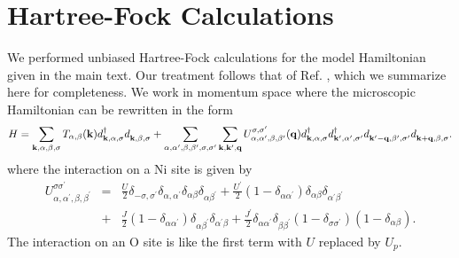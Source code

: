 \documentclass[showpacs,preprintnumbers,amsmath,amssymb,prl,aps,onecolumn,superscriptaddress]{revtex4}
\newcommand{\bk}{{\bf k}}
\newcommand{\bq}{{\bf q}}
\begin{document}
\section{Hartree-Fock Calculations}
We performed unbiased Hartree-Fock calculations for the model
Hamiltonian given in the main text.   
Our treatment follows that of Ref. , which we 
summarize here for completeness. We work in momentum space where the 
microscopic Hamiltonian can be rewritten in the form 
\begin{equation}
H=\sum_{\bk,\alpha,\beta,\sigma} T_{\alpha,\beta}(\bk) d^\dagger_{\bk,\alpha,\sigma}
d^{\phantom\dagger}_{\bk,\beta,\sigma} 
+ \sum_{\alpha,\alpha^\prime,\beta,\beta^\prime,\sigma,\sigma^\prime}\sum_{\bk,\bk^\prime,\bq} 
U^{\sigma,\sigma^\prime}_{\alpha,\alpha^\prime,\beta,\beta^\prime}(\bq)  
d^{\dagger}_{\bk,\alpha,\sigma}d^{\dagger}_{\bk^\prime,\alpha^\prime,\sigma^\prime}
d^{\phantom\dagger}_{\bk^\prime-\bq,\beta^\prime,\sigma^\prime}
d^{\phantom\dagger}_{\bk+\bq,\beta,\sigma}. 
\end{equation}
where the interaction on a Ni site is given by  
\begin{eqnarray}
U^{\sigma\sigma^\prime}_{\alpha,\alpha^\prime,\beta,\beta^\prime}&=& 
 \frac{U}{2} \delta_{-\sigma,\sigma^\prime}\delta_{\alpha,\alpha^\prime}\delta_{\alpha\beta}\delta_{\alpha\beta^\prime}  
 +\frac{U^\prime}{2}(1-\delta_{\alpha\alpha^\prime}) \delta_{\alpha\beta}\delta_{\alpha^\prime\beta^\prime} \\\nonumber
 &+&\frac{J}{2}(1-\delta_{\alpha\alpha^\prime})\delta_{\alpha\beta^\prime}\delta_{\alpha^\prime\beta} + 
 \frac{J^\prime}{2}\delta_{\alpha\alpha^\prime}\delta_{\beta\beta^\prime}(1-\delta_{\sigma\sigma^\prime})(1-\delta_{\alpha\beta}).
\end{eqnarray} 
The interaction on an O site is like the first term with $U$ replaced by $U_p$. 
\end{document}
